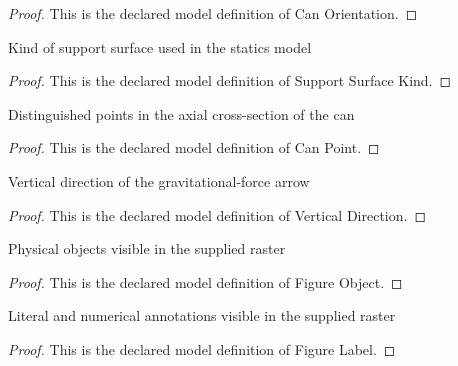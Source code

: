 \begin{proof}
  This is the declared model definition of Can Orientation.
\end{proof}
\begin{definition}
  \label{def:physics:phyx-mini-0710:phyxminiproblems-problemphyxmini0710-supportsurfacekind}
  Kind of support surface used in the statics model
\end{definition}
\begin{proof}
  This is the declared model definition of Support Surface Kind.
\end{proof}
\begin{definition}
  \label{def:physics:phyx-mini-0710:phyxminiproblems-problemphyxmini0710-canpoint}
  Distinguished points in the axial cross-section of the can
\end{definition}
\begin{proof}
  This is the declared model definition of Can Point.
\end{proof}
\begin{definition}
  \label{def:physics:phyx-mini-0710:phyxminiproblems-problemphyxmini0710-verticaldirection}
  Vertical direction of the gravitational-force arrow
\end{definition}
\begin{proof}
  This is the declared model definition of Vertical Direction.
\end{proof}
\begin{definition}
  \label{def:physics:phyx-mini-0710:phyxminiproblems-problemphyxmini0710-figureobject}
  Physical objects visible in the supplied raster
\end{definition}
\begin{proof}
  This is the declared model definition of Figure Object.
\end{proof}
\begin{definition}
  \label{def:physics:phyx-mini-0710:phyxminiproblems-problemphyxmini0710-figurelabel}
  Literal and numerical annotations visible in the supplied raster
\end{definition}
\begin{proof}
  This is the declared model definition of Figure Label.
\end{proof}
